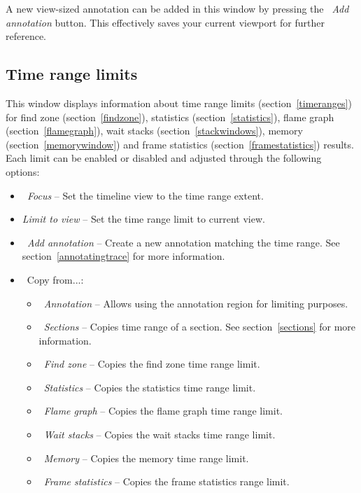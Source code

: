 \documentclass[hidelinks,titlepage,a4paper,twoside]{article}
\begin{document}
A new view-sized annotation can be added in this window by pressing the \emph{\faNoteSticky{}~Add annotation} button. This effectively saves your current viewport for further reference.

\subsection{Time range limits}
\label{timerangelimits}

This window displays information about time range limits (section~\ref{timeranges}) for find zone (section~\ref{findzone}), statistics (section~\ref{statistics}), flame graph (section~\ref{flamegraph}), wait stacks (section~\ref{stackwindows}), memory (section~\ref{memorywindow}) and frame statistics (section~\ref{framestatistics}) results. Each limit can be enabled or disabled and adjusted through the following options:

\begin{itemize}
\item \emph{\faMicroscope{}~Focus} -- Set the timeline view to the time range extent.
\item \emph{Limit to view} -- Set the time range limit to current view.
\item \emph{\faNoteSticky{}~Add annotation} -- Create a new annotation matching the time range. See section~\ref{annotatingtrace} for more information.
\item \faCopy{}~Copy from...:
\begin{itemize}
\item \emph{\faNoteSticky{}~Annotation} -- Allows using the annotation region for limiting purposes.
\item \emph{\faArrowsLeftRightToLine{}~Sections} -- Copies time range of a section. See section~\ref{sections} for more information.
\item \emph{\faMagnifyingGlass{}~Find zone} -- Copies the find zone time range limit.
\item \emph{\faArrowUpWideShort{}~Statistics} -- Copies the statistics time range limit.
\item \emph{\faFireFlameCurved{}~Flame graph} -- Copies the flame graph time range limit.
\item \emph{\faHourglassHalf{}~Wait stacks} -- Copies the wait stacks time range limit.
\item \emph{\faMemory{}~Memory} -- Copies the memory time range limit.
\item \emph{\faImages{}~Frame statistics} -- Copies the frame statistics range limit.
\end{itemize}
\end{itemize}
\end{document}
